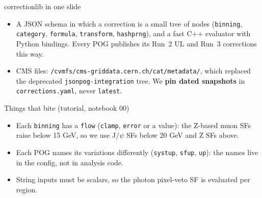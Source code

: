 \documentclass[aspectratio=169,11pt]{beamer}
\newcommand{\code}[1]{{\small\colorbox{codebg}{\texttt{#1}}}}
\begin{document}
\begin{frame}{correctionlib in one slide}
  \begin{itemize}
    \item A JSON schema in which a correction is a small tree of nodes (\code{binning},
          \code{category}, \code{formula}, \code{transform}, \code{hashprng}), and a fast C++
          evaluator with Python bindings. Every POG publishes its Run~2 UL and Run~3 corrections
          this way.
    \item CMS files: \code{/cvmfs/cms-griddata.cern.ch/cat/metadata/}, which replaced the
          deprecated \code{jsonpog-integration} tree. We \textbf{pin dated snapshots} in
          \code{corrections.yaml}, never \code{latest}.
  \end{itemize}

  \vspace{0.2em}
  {\footnotesize
  \begin{block}{Things that bite (tutorial, notebook 00)}
    \begin{itemize}
      \item Each \code{binning} has a \code{flow} (\code{clamp}, \code{error} or a value): the Z-based
            muon SFs raise below 15 GeV, so we use J/$\psi$ SFs below 20 GeV and Z SFs above.
      \item Each POG names its variations differently (\code{systup}, \code{sfup}, \code{up}): the
            names live in the config, not in analysis code.
      \item String inputs must be scalars, so the photon pixel-veto SF is evaluated per region.
    \end{itemize}
  \end{block}}
\end{frame}
\end{document}
